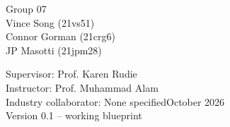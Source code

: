 \begin{titlepage}\centering\vspace*{1in}{\Huge\bfseries Autonomous Smart Caddy Cart (ASCC)\par}\vspace{.4in}{\Large ELEC 490/498 Engineering Blueprint\par} \vspace{.4in}\vspace{.5in}\par Group 07\\ Vince Song (21vs51)\\ Connor Gorman (21crg6)\\ JP Masotti (21jpm28)\vspace{.4in}\par Supervisor: Prof. Karen Rudie\\ Instructor: Prof. Muhammad Alam\\ Industry collaborator: None specified\vfill October 2026\\ Version 0.1 -- working blueprint\end{titlepage}
